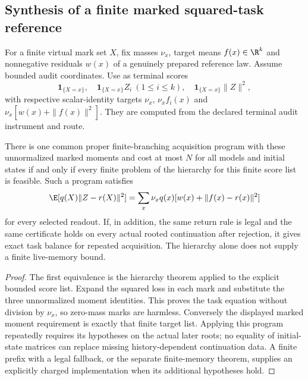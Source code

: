 \subsection{Synthesis of a finite marked squared-task reference}
For a finite virtual mark set $X$, fix masses $\nu_x$, target means $f(x)\in\R^k$ and nonnegative residuals $w(x)$ of a genuinely prepared reference law. Assume bounded audit coordinates. Use as terminal scores
\[
 \mathbf1_{\{X=x\}},\quad
 \mathbf1_{\{X=x\}}Z_i\ (1\le i\le k),\quad
 \mathbf1_{\{X=x\}}\|Z\|^2,
\]
with respective scalar-identity targets $\nu_x$, $\nu_x f_i(x)$ and $\nu_x[w(x)+\|f(x)\|^2]$. They are computed from the declared terminal audit instrument and route.

\begin{corollary}\label{cor:balance-hierarchy}
There is one common proper finite-branching acquisition program with these unnormalized marked moments and cost at most $N$ for all models and initial states if and only if every finite problem of the hierarchy for this finite score list is feasible. Such a program satisfies
\[
 \E[q(X)\|Z-r(X)\|^2]
   =\sum_x\nu_x q(x)[w(x)+\|f(x)-r(x)\|^2]
\]
for every selected readout. If, in addition, the same return rule is legal and the same certificate holds on every actual rooted continuation after rejection, it gives exact task balance for repeated acquisition. The hierarchy alone does not supply a finite live-memory bound.
\end{corollary}
\begin{proof}
The first equivalence is the hierarchy theorem applied to the explicit bounded score list. Expand the squared loss in each mark and substitute the three unnormalized moment identities. This proves the task equation without division by $\nu_x$, so zero-mass marks are harmless. Conversely the displayed marked moment requirement is exactly that finite target list. Applying this program repeatedly requires its hypotheses on the actual later roots; no equality of initial-state matrices can replace missing history-dependent continuation data. A finite prefix with a legal fallback, or the separate finite-memory theorem, supplies an explicitly charged implementation when its additional hypotheses hold.
\end{proof}
